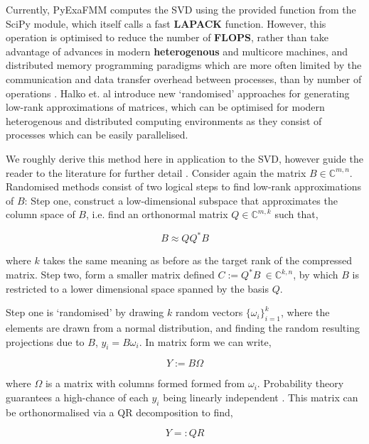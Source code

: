Currently, \gls{PyExaFMM} computes the \gls{SVD} using the provided function
from the SciPy module, which itself calls a fast \textbf{\gls{LAPACK}}
function. However, this operation is optimised to reduce the number
of \textbf{\gls{FLOPS}}, rather than take advantage of advances in modern
\textbf{\gls{heterogenous}} and multicore machines, and
distributed memory programming paradigms which are more often limited by the
communication and data transfer overhead between processes, than by number of
operations \cite{Halko:2011:SIAM}. Halko et. al introduce new `randomised'
approaches for generating low-rank approximations of matrices, which can be
optimised for modern heterogenous and distributed computing environments as they
consist of processes which can be easily parallelised.

We roughly derive this method here in application to the \gls{SVD}, however guide
the reader to the literature for further detail \cite{Erichson:2019:JOSS,Halko:2011:SIAM}.
Consider again the matrix $B \in \mathbb{C}^{m, n}$. Randomised methods consist
of two logical steps to find low-rank approximations of $B$: Step one, construct
a low-dimensional subspace that approximates the column space of $B$, i.e.
find an orthonormal matrix $Q \in \mathbb{C}^{m, k}$ such that,

\begin{equation}
    B \approx QQ^*B
    \label{eq:2_4_step_1_randomised}
\end{equation}

where $k$ takes the same meaning as before as the target rank of the compressed
matrix. Step two, form a smaller matrix defined $C := Q^*B \> \in \mathbb{C}^{k, n}$,
by which $B$ is restricted to a lower dimensional space spanned by the basis
$Q$.

Step one is `randomised' by drawing $k$ random vectors $\{ \omega_i \}_{i=1}^k$,
where the elements are drawn from a normal distribution, and finding the random
resulting projections due to $B$, $y_i = B \omega_i$. In matrix form we can write,

\begin{equation}
    Y := B \Omega
\end{equation}

where $\Omega$ is a matrix with columns formed formed from $\omega_i$.
Probability theory guarantees a high-chance of each $y_i$ being linearly independent
\cite{Erichson:2019:JOSS}. This matrix can be orthonormalised via a QR decomposition
to find,

\begin{equation}
    Y =: QR
\end{equation}

